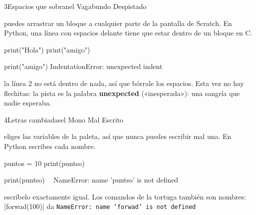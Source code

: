 \begin{bzcard}{3}{Espacios que sobran}{el Vagabundo Despistado}
\noindent\begin{minipage}[c]{0.43\linewidth}
 puedes arrastrar un bloque a cualquier parte de la pantalla de Scratch. En Python, una línea con espacios delante tiene que estar dentro de un bloque en C.
\end{minipage}\hfill
\begin{minipage}[c]{0.54\linewidth}
\begin{bzsnip}
print("Hola")
    print("amigo")
\end{bzsnip}
\end{minipage}\par
\begin{bzerror}
    print("amigo")
IndentationError: unexpected indent
\end{bzerror}
 la línea 2 no está dentro de nada, así que bórrale los espacios. Esta vez no hay flechitas: la pista es la palabra \textbf{unexpected} («inesperada»): una sangría que nadie esperaba.
\end{bzcard}

\begin{bzcard}{4}{Letras cambiadas}{el Mono Mal Escrito}
\noindent\begin{minipage}[c]{0.43\linewidth}
 eliges las variables de la paleta, así que nunca puedes escribir mal una. En Python escribes cada nombre.
\end{minipage}\hfill
\begin{minipage}[c]{0.54\linewidth}
\begin{bzsnip}
puntos = 10
print(puntso)
\end{bzsnip}
\end{minipage}\par
\begin{bzerror}
    print(puntso)
          ^^^^^^
NameError: name 'puntso' is not defined
\end{bzerror}
 escríbelo exactamente igual. Los comandos de la tortuga también son nombres: \py|forwad(100)| da \texttt{NameError: name 'forwad' is not defined}
\end{bzcard}


